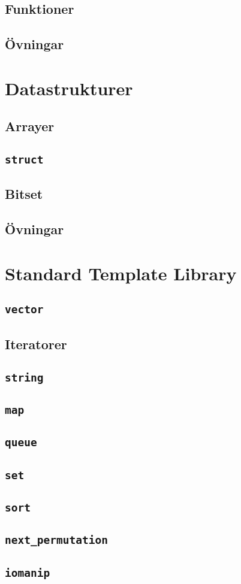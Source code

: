 \documentclass[10pt,a4paper]{report}
\begin{document}
\subsection{Funktioner}

\subsection{Övningar}


\section{Datastrukturer}
\subsection{Arrayer}

\subsection{\texttt{struct}}
\subsection{Bitset}
\subsection{Övningar}


\section{Standard Template Library}
\subsection{\texttt{vector}}
\subsection{Iteratorer}
\subsection{\texttt{string}}
\subsection{\texttt{map}}
\subsection{\texttt{queue}}
\subsection{\texttt{set}}
\subsection{\texttt{sort}}
\subsection{\texttt{next\_permutation}}
\subsection{\texttt{iomanip}}

\end{document}
